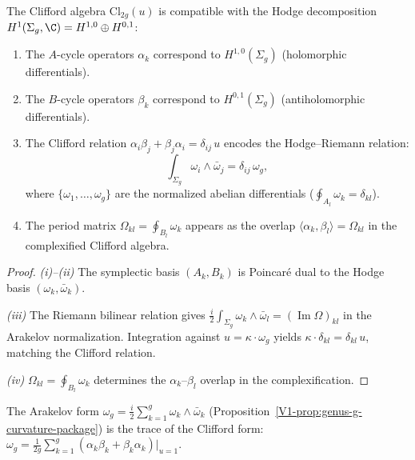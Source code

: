 \begin{proposition}
The Clifford algebra $\mathrm{Cl}_{2g}(u)$ is compatible with the
Hodge decomposition $H^1(\Sigma_g, \C) = H^{1,0} \oplus H^{0,1}$:
\begin{enumerate}[label=\textup{(\roman*)}]
\item The $A$-cycle operators $\alpha_k$ correspond to
$H^{1,0}(\Sigma_g)$ (holomorphic differentials).

\item The $B$-cycle operators $\beta_k$ correspond to
$H^{0,1}(\Sigma_g)$ (antiholomorphic differentials).

\item The Clifford relation $\alpha_i \beta_j + \beta_j \alpha_i =
\delta_{ij}\, u$ encodes the Hodge--Riemann relation:
\[
\int_{\Sigma_g} \omega_i \wedge \bar\omega_j = \delta_{ij}\, \omega_g,
\]
where $\{\omega_1, \ldots, \omega_g\}$ are the normalized abelian
differentials ($\oint_{A_l}\omega_k = \delta_{kl}$).

\item The period matrix $\Omega_{kl} = \oint_{B_l}\omega_k$ appears as
the overlap $\langle \alpha_k, \beta_l \rangle = \Omega_{kl}$ in the
complexified Clifford algebra.
\end{enumerate}
\end{proposition}

\begin{proof}
\emph{(i)--(ii)} The symplectic basis $(A_k, B_k)$ is Poincar\'e dual
to the Hodge basis $(\omega_k, \bar\omega_k)$.

\emph{(iii)} The Riemann bilinear relation gives
$\frac{i}{2}\int_{\Sigma_g}\omega_k \wedge \bar\omega_l =
(\operatorname{Im}\Omega)_{kl}$ in the Arakelov normalization.
Integration against $u = \kappa \cdot \omega_g$ yields
$\kappa \cdot \delta_{kl} = \delta_{kl}\, u$, matching the
Clifford relation.

\emph{(iv)} $\Omega_{kl} = \oint_{B_l}\omega_k$ determines the
$\alpha_k$--$\beta_l$ overlap in the complexification.
\end{proof}

\begin{remark}
The Arakelov form $\omega_g = \frac{i}{2}\sum_{k=1}^g
\omega_k \wedge \bar\omega_k$
(Proposition~\ref{V1-prop:genus-g-curvature-package}) is the trace of the
Clifford form: $\omega_g = \frac{1}{2g}\sum_{k=1}^g
(\alpha_k\beta_k + \beta_k\alpha_k)|_{u=1}$.
\end{remark}

